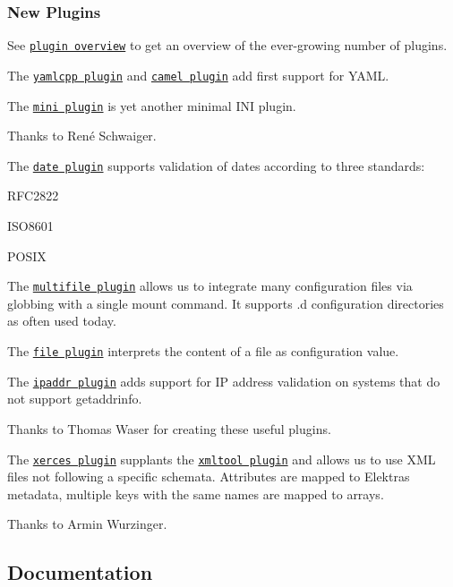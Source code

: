\subsubsection*{New Plugins}

See \href{https://www.libelektra.org/plugins/}{\tt plugin overview} to get an overview of the ever-\/growing number of plugins.

The \href{https://www.libelektra.org/plugins/yamlcpp}{\tt yamlcpp plugin} and \href{https://www.libelektra.org/plugins/camel}{\tt camel plugin} add first support for Y\+A\+ML.

The \href{https://www.libelektra.org/plugins/mini}{\tt mini plugin} is yet another minimal I\+NI plugin.

Thanks to René Schwaiger.

The \href{https://www.libelektra.org/plugins/date}{\tt date plugin} supports validation of dates according to three standards\+:


\begin{DoxyItemize}
\item {\ttfamily R\+F\+C2822}
\item {\ttfamily I\+S\+O8601}
\item {\ttfamily P\+O\+S\+IX}
\end{DoxyItemize}

The \href{https://www.libelektra.org/plugins/multifile}{\tt multifile plugin} allows us to integrate many configuration files via globbing with a single mount command. It supports {\ttfamily .d} configuration directories as often used today.

The \href{https://www.libelektra.org/plugins/file}{\tt file plugin} interprets the content of a file as configuration value.

The \href{https://www.libelektra.org/plugins/ipaddr}{\tt ipaddr plugin} adds support for IP address validation on systems that do not support {\ttfamily getaddrinfo}.

Thanks to Thomas Waser for creating these useful plugins.

The \href{https://www.libelektra.org/plugins/xerces}{\tt xerces plugin} supplants the \href{https://www.libelektra.org/plugins/xmltool}{\tt xmltool plugin} and allows us to use X\+ML files not following a specific schemata. Attributes are mapped to Elektra\textquotesingle{}s metadata, multiple keys with the same names are mapped to arrays.

Thanks to Armin Wurzinger.

\subsection*{Documentation}

